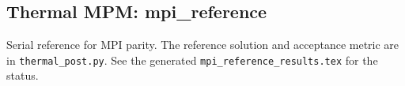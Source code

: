\subsection{Thermal MPM: mpi\_reference}
Serial reference for MPI parity. The reference solution and acceptance metric are in \texttt{thermal\_post.py}. See the generated \texttt{mpi\_reference\_results.tex} for the status.

